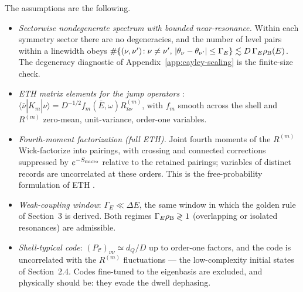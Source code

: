 \documentclass[12pt]{article}
\newcommand{\Smicro}{S_{\rm micro}}
\newcommand{\rhoB}{\rho_{\rm B}}
\newcommand{\ket}[1]{|#1\rangle}
\newcommand{\bra}[1]{\langle #1|}
\begin{document}
The assumptions are the following.
\begin{itemize}
\item[(E1)]
\emph{Sectorwise nondegenerate spectrum with bounded near-resonance.}  Within
each symmetry sector there are no degeneracies, and the number of level pairs
within a linewidth obeys
$\#\{(\nu,\nu')\!:\nu\ne\nu',\,|\theta_\nu-\theta_{\nu'}|\le\Gamma_E\}
\lesssim D\,\Gamma_E\rhoB(E)$.
The degeneracy diagnostic of Appendix~\ref{app:cayley-scaling} is the
finite-size check.
\item[(E2)]
\emph{ETH matrix elements for the jump operators} \cite{Srednicki1999,
DAlessioKafriPolkovnikovRigol2016}:
$\bra{\bar\nu}\widehat K_m\ket\nu=D^{-1/2}f_m(\bar E,\omega)
R^{(m)}_{\bar\nu\nu}$,
with $f_m$ smooth across the shell and $R^{(m)}$ zero-mean, unit-variance,
order-one variables.
\item[(E3)]
\emph{Fourth-moment factorization (full ETH).}  Joint fourth moments of the
$R^{(m)}$ Wick-factorize into pairings, with crossing and connected
corrections suppressed by $e^{-\Smicro}$ relative to the retained pairings;
variables of distinct records are uncorrelated at these orders.  This is the
free-probability formulation of ETH
\cite{FoiniKurchan2019,PappalardiFoiniKurchan2022}.
\item[(E4)]
\emph{Weak-coupling window}: $\Gamma_E\ll\Delta E$, the same window in which
the golden rule of Section~3 is derived.  Both regimes
$\Gamma_E\rhoB\gtrless1$ (overlapping or isolated resonances) are admissible.
\item[(E5)]
\emph{Shell-typical code}: $(P_{\mathcal C})_{\nu\nu}\simeq d_Q/D$ up to
order-one factors, and the code is uncorrelated with the $R^{(m)}$
fluctuations --- the low-complexity initial states of Section~2.4.  Codes
fine-tuned to the eigenbasis are excluded, and physically should be: they
evade the dwell dephasing.
\end{itemize}
\end{document}

